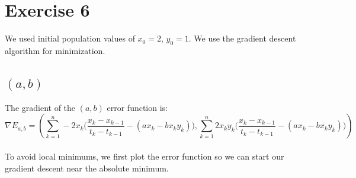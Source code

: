 \documentclass{article}
\begin{document}
\section{Exercise 6}
We used initial population values of $x_0=2$, $y_0=1$.
We use the gradient descent algorithm for minimization.
\subsection{$(a,b)$}
The gradient of the $(a,b)$ error function is:
\begin{equation*}
  \nabla E_{a,b}=
  \left (
    \sum_{k=1}^{n}-2x_k\Big(\frac{x_k-x_{k-1}}{t_k-t_{k-1}}-(ax_k - bx_ky_k)\Big),
    \sum_{k=1}^{n}2x_ky_k\Big(\frac{x_k-x_{k-1}}{t_k-t_{k-1}}-(ax_k - bx_ky_k)\Big)
  \right )
\end{equation*}\\
To avoid local minimums, we first plot the error function so we can start our gradient descent near the absolute minimum.
\\
\end{document}
